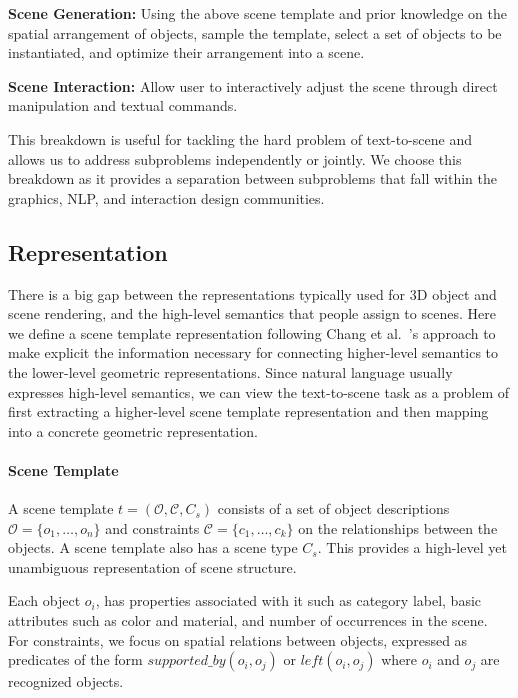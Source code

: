 \documentclass{sigchi}
\begin{document}
\textbf{Scene Generation:} Using the above scene template and prior knowledge on the spatial arrangement of objects, sample the template, select a set of objects to be instantiated, and optimize their arrangement into a scene.

\textbf{Scene Interaction:} Allow user to interactively adjust the scene through direct manipulation and textual commands.

This breakdown is useful for tackling the hard problem of text-to-scene and allows us to address subproblems independently or jointly.  We choose this breakdown as it provides a separation between subproblems that fall within the graphics, NLP, and interaction design communities.


\subsection{Representation}

There is a big gap between the representations typically used for 3D object and scene rendering, and the high-level semantics that people assign to scenes.  Here we define a scene template representation following Chang et al.~\cite{chang2014spatial}'s approach to make explicit the information necessary for connecting higher-level semantics to the lower-level geometric representations.  Since natural language usually expresses high-level semantics, we can view the text-to-scene task as a problem of first extracting a higher-level scene template representation and then mapping into a concrete geometric representation.

\paragraph{Scene Template}
A scene template $t=(\mathcal{O}, \mathcal{C}, C_s)$ consists of a set of object descriptions $\mathcal{O} = \{o_1, \ldots, o_n\}$ and constraints $\mathcal{C} = \{c_1, \ldots, c_k\}$ on the relationships between the objects. A scene template also has a scene type $C_s$.  This provides a high-level yet unambiguous representation of scene structure.

Each object $o_i$, has properties associated with it such as category label, basic attributes such as color and material, and number of occurrences in the scene.  For constraints, we focus on spatial relations between objects, expressed as predicates of the form $\textit{supported\_by}(o_i,o_j)$ or $\textit{left}(o_i,o_j)$ where $o_i$ and $o_j$ are recognized objects.
\end{document}
